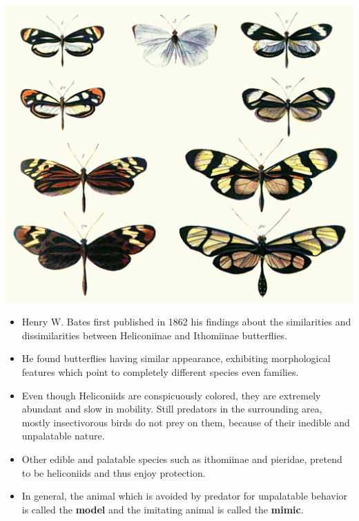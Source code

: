 \documentclass[a0,portrait]{a0poster}
\begin{document}
\begin{multicols}{2}
\begin{center}\vspace{1cm}
\includegraphics[width=0.5\linewidth]{Batesplate_ArM.png}
\end{center}\vspace{1cm}

\begin{itemize}
	\item Henry W. Bates first published in 1862 his findings about the similarities and dissimilarities between Heliconiinae and Ithomiinae butterflies.
	\item He found butterflies having similar appearance, exhibiting morphological features which point to completely different species even families.
	\item Even though Heliconiids are conspicuously colored, they are extremely abundant and slow in mobility. Still predators in the surrounding area, mostly insectivorous birds do not prey on them, because of their inedible and unpalatable nature.
	\item Other edible and palatable species such as ithomiinae and pieridae, pretend to be heliconiids and thus enjoy protection.
	\item In general, the animal which is avoided by predator for unpalatable behavior is called the \textbf{model} and the imitating animal is called the \textbf{mimic}.
\end{itemize}

\color{DarkSlateGray}

\end{multicols}
\end{document}
